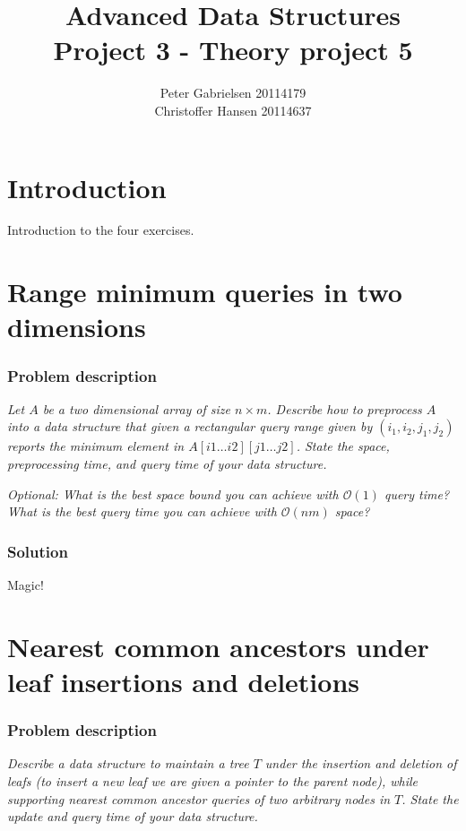 \documentclass[a4paper,oneside,article,11pt]{memoir}
\title{Advanced Data Structures \\ Project 3 - Theory project 5}
\author{Peter Gabrielsen 20114179 \\
Christoffer Hansen 20114637}
\begin{document}
\begin{titlingpage}
\clearpage

\maketitle
\thispagestyle{empty}

\begin{abstract}

\end{abstract}
\end{titlingpage}

\pagebreak

\tableofcontents

\pagebreak

\chapter{Introduction}
Introduction to the four exercises.

\chapter{Range minimum queries in two dimensions}
\label{chp:rmq2d}
\subsection{Problem description}
\textit{Let $A$ be a two dimensional array of size $n \times m$. Describe how to preprocess $A$ into a data structure that given a rectangular query range given by $(i_1,i_2,j_1,j_2)$ reports the minimum element in $A\left[ i1\dots i2\right]\left[j1\dots j2\right]$. State the space, preprocessing time, and query time of your data structure.}

\textit{Optional: What is the best space bound you can achieve with $\mathcal{O}(1)$ query time? What is the best query time you can achieve with $\mathcal{O}(nm)$ space?}

\subsection{Solution}
Magic!

\chapter{Nearest common ancestors under leaf insertions and deletions}
\label{chp:LCA}
\subsection{Problem description}
\textit{Describe a data structure to maintain a tree $T$ under the insertion and deletion of leafs (to insert a new leaf we are given a pointer to the parent node), while supporting nearest common ancestor queries of two arbitrary nodes in $T$. State the update and query time of your data structure.}
\end{document}
